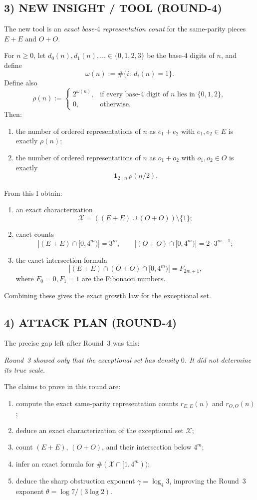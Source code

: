 \subsection*{3) NEW INSIGHT / TOOL (ROUND-4)}
The new tool is an \emph{exact base-\(4\) representation count} for the same-parity pieces \(E+E\) and \(O+O\).

For \(n\ge 0\), let \(d_0(n),d_1(n),\dots\in\{0,1,2,3\}\) be the base-\(4\) digits of \(n\), and define
\[
\omega(n):=\#\{i:\ d_i(n)=1\}.
\]
Define also
\[
\rho(n):=
\begin{cases}
2^{\omega(n)},&\text{if every base-4 digit of }n\text{ lies in }\{0,1,2\},\\
0,&\text{otherwise.}
\end{cases}
\]
Then:
\begin{enumerate}
\item the number of ordered representations of \(n\) as \(e_1+e_2\) with \(e_1,e_2\in E\) is exactly \(\rho(n)\);
\item the number of ordered representations of \(n\) as \(o_1+o_2\) with \(o_1,o_2\in O\) is exactly
\[
\mathbf 1_{2\mid n}\,\rho(n/2).
\]
\end{enumerate}

From this I obtain:
\begin{enumerate}
\item an exact characterization
\[
\mathcal X=((E+E)\cup(O+O))\setminus\{1\};
\]
\item exact counts
\[
|(E+E)\cap[0,4^m)|=3^m,\qquad |(O+O)\cap[0,4^m)|=2\cdot 3^{m-1};
\]
\item the exact intersection formula
\[
|(E+E)\cap(O+O)\cap[0,4^m)|=F_{2m+1},
\]
where \(F_0=0,F_1=1\) are the Fibonacci numbers.
\end{enumerate}

Combining these gives the exact growth law for the exceptional set.

\subsection*{4) ATTACK PLAN (ROUND-4)}
The precise gap left after Round~3 was this:

\medskip
\noindent
\emph{Round~3 showed only that the exceptional set has density \(0\). It did not determine its true scale.}

\medskip
The claims to prove in this round are:
\begin{enumerate}
\item compute the exact same-parity representation counts \(r_{E,E}(n)\) and \(r_{O,O}(n)\);
\item deduce an exact characterization of the exceptional set \(\mathcal X\);
\item count \((E+E)\), \((O+O)\), and their intersection below \(4^m\);
\item infer an exact formula for \(\#(\mathcal X\cap[1,4^m))\);
\item deduce the sharp obstruction exponent \(\gamma=\log_4 3\), improving the Round~3 exponent \(\theta=\log 7/(3\log 2)\).
\end{enumerate}

